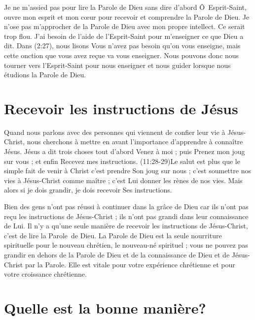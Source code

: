 Je ne m'assied pas pour lire la Parole de Dieu sans dire d'abord\frcolon{} \linebreak
 \Og \^O~Esprit-Saint, ouvre mon esprit et mon cœur pour recevoir
 et comprendre la Parole de Dieu. \Fg{}
 Je n'ose pas m'approcher de la Parole de Dieu avec mon propre intellect.
 Ce serait trop flou. J'ai besoin de l'aide de l'Esprit-Saint
 pour m'enseigner ce que Dieu a dit.
 Dans (2:27), nous lisons\frcolon{}
 \Og Vous n'avez pas besoin qu'on vous enseigne, mais cette onction
 que vous avez reçue va vous enseigner. \Fg{}
 Nous pouvons donc nous tourner vers l'Esprit-Saint
 pour nous enseigner et nous guider lorsque nous étudions
 la Parole de Dieu.
 \nowidow[3]


\section{Recevoir les instructions de J\'esus}

Quand nous parlons avec des personnes qui viennent de confier leur vie
 à Jésus-Christ, nous cherchons à mettre en avant l'im\-por\-tance d'apprendre
 à connaître Jésus. Jésus a dit trois choses \ocadr tout d'abord\frcolon{}
 \Og Venez à moi \Fg{} ; puis\frcolon{} \Og Prenez mon joug sur vous \Fg{} ;
 et enfin\frcolon{} \Og Recevez mes instructions. \Fg{}
 (11:28-29)Le salut est plus que le simple fait
 de venir à Christ\frcolon{}
 c'est prendre Son joug sur nous ;
 c'est soumettre nos vies à Jésus-Christ comme maître ;
 c'est Lui donner les rènes de nos vies.
 Mais alors si je dois grandir, je dois recevoir Ses instructions.

Bien des gens n'ont pas réussi à continuer dans la grâce de Dieu
 car ils n'ont pas reçu les instructions de Jésus-Christ ;
 ils n'ont pas grandi dans leur connaissance de Lui.
 Il n'y a qu'une seule manière de recevoir les instructions de Jésus-Christ,
 c'est de lire la Parole~de Dieu.
 La Parole de Dieu est la seule nourriture spirituelle pour le nouveau
 chrétien, le nouveau-né spirituel ; vous ne pouvez pas grandir en dehors
 de la Parole de Dieu et de la connaissance de Dieu et de Jésus-Christ
 par la Parole.
 Elle est vitale pour votre expérience  chrétienne
 et pour votre croissance chrétienne.


\section{Quelle est la bonne mani\`ere?}


